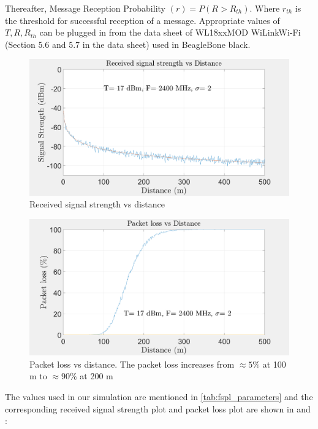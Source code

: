 Thereafter, Message Reception Probability $(r) = P(R > R_{th})$. Where $r_{th}$ is the threshold for successful reception of a message. Appropriate values of $T, R, R_{th}$ can be plugged in from the data sheet of WL18xxMOD WiLink\texttrademark Wi-Fi\textregistered   \cite{wilink} (Section 5.6 and 5.7 in the data sheet) used in BeagleBone black.

\begin{figure}[hbtp]
\centering
\includegraphics[width=1\textwidth]{ncsuthesis-0.6/Chapter-4/figs/signal_strength}
\caption{Received signal strength vs distance}
\label{fig:signal_strength}
\end{figure}

\begin{figure}[hbtp]
\centering
\includegraphics[width=1\textwidth]{ncsuthesis-0.6/Chapter-4/figs/packet_loss}
\caption{Packet loss vs distance. The packet loss increases from $\approx 5\%$ at 100 m to $\approx 90\%$ at 200 m}
\label{fig:packet_loss}
\end{figure}
The values used in our simulation are mentioned in \ref{tab:fspl_parameters} and the corresponding received signal strength plot and packet loss plot are shown in  and :

